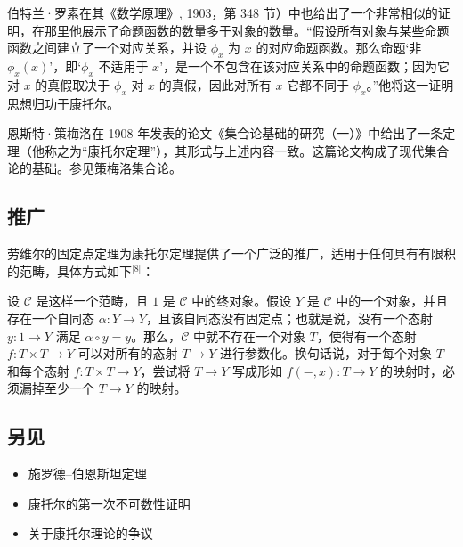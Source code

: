 伯特兰·罗素在其《数学原理》, 1903，第 348 节）中也给出了一个非常相似的证明，在那里他展示了命题函数的数量多于对象的数量。“假设所有对象与某些命题函数之间建立了一个对应关系，并设 $\phi_x$ 为 $x$ 的对应命题函数。那么命题‘非 $\phi_x(x)$’，即‘$\phi_x$ 不适用于 $x$’，是一个不包含在该对应关系中的命题函数；因为它对 $x$ 的真假取决于 $\phi_x$ 对 $x$ 的真假，因此对所有 $x$ 它都不同于 $\phi_x$。”他将这一证明思想归功于康托尔。

恩斯特·策梅洛在 1908 年发表的论文《集合论基础的研究（一）》中给出了一条定理（他称之为“康托尔定理”），其形式与上述内容一致。这篇论文构成了现代集合论的基础。参见策梅洛集合论。
\subsection{推广}
劳维尔的固定点定理为康托尔定理提供了一个广泛的推广，适用于任何具有有限积的范畴，具体方式如下\(^\text{[8]}\)：

设 $\mathcal{C}$ 是这样一个范畴，且 $1$ 是 $\mathcal{C}$ 中的终对象。假设 $Y$ 是 $\mathcal{C}$ 中的一个对象，并且存在一个自同态 $\alpha : Y \to Y$，且该自同态没有固定点；也就是说，没有一个态射 $y : 1 \to Y$ 满足 $\alpha \circ y = y$。那么，$\mathcal{C}$ 中就不存在一个对象 $T$，使得有一个态射 $f : T \times T \to Y$ 可以对所有的态射 $T \to Y$ 进行参数化。换句话说，对于每个对象 $T$ 和每个态射 $f : T \times T \to Y$，尝试将 $T \to Y$ 写成形如 $f(-,x) : T \to Y$ 的映射时，必须漏掉至少一个 $T \to Y$ 的映射。
\subsection{另见}
\begin{itemize}
\item 施罗德–伯恩斯坦定理
\item 康托尔的第一次不可数性证明
\item 关于康托尔理论的争议
\end{itemize}